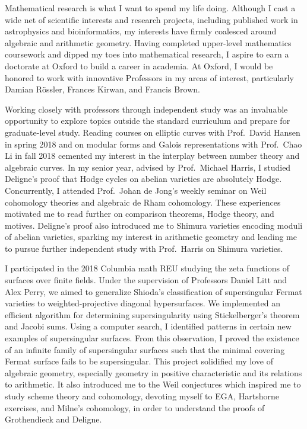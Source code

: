 \documentclass[11pt]{article}
\begin{document}
Mathematical research is what I want to spend my life doing. Although I cast a wide net of scientific interests and research projects, including published work in astrophysics and bioinformatics, my interests have firmly coalesced around algebraic and arithmetic geometry. Having completed upper-level mathematics coursework and dipped my toes into mathematical research, I aspire to earn a doctorate at Oxford to build a career in academia. At Oxford, I would be honored to work with innovative Professors in my areas of interest, particularly Damian R\"{o}ssler, Frances Kirwan, and Francis Brown.
\par
Working closely with professors through independent study was an invaluable opportunity to explore topics outside the standard curriculum and prepare for graduate-level study. Reading courses on elliptic curves with Prof.\ David Hansen in spring 2018 and on modular forms and Galois representations with Prof.\ Chao Li in fall 2018 cemented my interest in the interplay between number theory and algebraic curves. In my senior year, advised by Prof.\ Michael Harris, I studied Deligne's proof that Hodge cycles on abelian varieties are absolutely Hodge. Concurrently, I attended Prof.\ Johan de Jong's weekly seminar on Weil cohomology theories and algebraic de Rham cohomology. These experiences motivated me to read further on comparison theorems, Hodge theory, and motives. Deligne's proof also introduced me to Shimura varieties encoding moduli of abelian varieties, sparking my interest in arithmetic geometry and leading me to pursue further independent study with Prof.\ Harris on Shimura varieties.
\par
I participated in the 2018 Columbia math REU studying the zeta functions of surfaces over finite fields. Under the supervision of Professors Daniel Litt and Alex Perry, we aimed to generalize Shioda’s classification of supersingular Fermat varieties  to weighted-projective diagonal hypersurfaces. We implemented an efficient algorithm for determining supersingularity using Stickelberger's theorem and Jacobi sums. Using a computer search, I identified patterns in certain new examples of supersingular surfaces. From this observation, I proved the existence of an infinite family of supersingular surfaces such that the minimal covering Fermat surface fails to be supersingular. This project solidified my love of algebraic geometry, especially geometry in positive characteristic and its relations to arithmetic. It also introduced me to the Weil conjectures which inspired me to study scheme theory and \etale cohomology, devoting myself to EGA, Hartshorne exercises, and Milne's \etale cohomology, in order to understand the proofs of Grothendieck and Deligne. 
\end{document}
